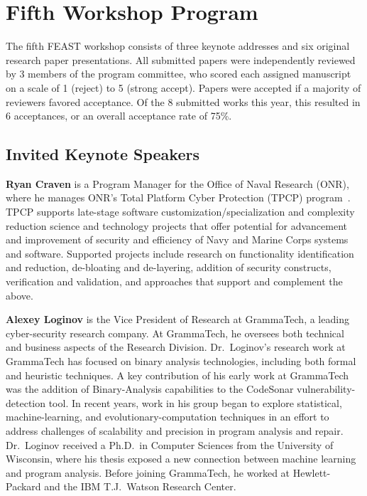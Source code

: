 \documentclass[sigconf]{acmart}
\newcommand\bio[1]{\noindent\textbf{#1}}
\begin{document}
\section{Fifth Workshop Program}
The fifth FEAST workshop consists of three keynote addresses and six original research paper presentations.
All submitted papers were independently reviewed by 3 members of the program committee, who scored each assigned manuscript on a scale of 1 (reject) to 5 (strong accept).
Papers were accepted if a majority of reviewers favored acceptance.
Of the 8 submitted works this year, this resulted in 6 acceptances, or an overall acceptance rate of 75\%.

\subsection{Invited Keynote Speakers}

\bio{Ryan Craven}
is a Program Manager for the Office of Naval Research (ONR),
where he manages ONR's Total Platform Cyber Protection (TPCP) program~\cite{tpcp}.
TPCP supports late-stage software customization/specialization and complexity reduction science and technology projects that offer potential for advancement and improvement of security and efficiency of Navy and Marine Corps systems and software.
Supported projects include research on
functionality identification and reduction,
de-bloating and de-layering,
addition of security constructs,
verification and validation,
and approaches that support and complement the above.

\bigskip

\bio{Alexey Loginov}
is the Vice President of Research at GrammaTech, a leading cyber-security research company.
At GrammaTech, he oversees both technical and business aspects of the Research Division.
Dr.~Loginov's research work at GrammaTech has focused on binary analysis technologies, including both formal and heuristic techniques.
A key contribution of his early work at GrammaTech was the addition of Binary-Analysis capabilities to the CodeSonar vulnerability-detection tool.
In recent years, work in his group began to explore statistical, machine-learning, and evolutionary-computation techniques in an effort to address challenges of scalability and precision in program analysis and repair.
Dr.~Loginov received a Ph.D.~in Computer Sciences from the University of Wisconsin, where his thesis exposed a new connection between machine learning and program analysis.
Before joining GrammaTech, he worked at Hewlett-Packard and the IBM T.J.~Watson Research Center.
\end{document}
